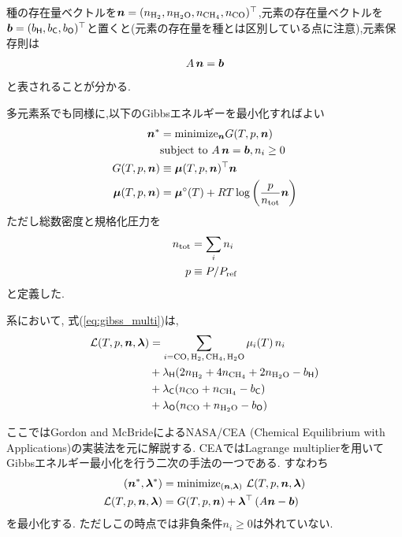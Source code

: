 種の存在量ベクトルを$\boldsymbol{n} = (n_\mathrm{H_2}, n_\mathrm{H_2 O},n_\mathrm{C H_4},n_\mathrm{CO})^\top$,元素の存在量ベクトルを$\boldsymbol{b} = (b_{\mathsf{H}}, b_{\mathsf{C}}, b_{\mathsf{O}})^\top$と置くと(元素の存在量を種とは区別している点に注意),元素保存則は
\begin{align}
    A \, \boldsymbol{n} = \boldsymbol{b} 
\end{align}
と表されることが分かる. 


多元素系でも同様に,以下のGibbsエネルギーを最小化すればよい
\begin{align}
\label{eq:gibss_multi}
    \boldsymbol{n}^\ast &= \mathrm{minimize}_{\boldsymbol{n}} G(T, p, \boldsymbol{n}) \nonumber \\
    &\mbox{subject to} \,\, A \, \boldsymbol{n} = \boldsymbol{b}, n_i \ge 0\\
    G(T, p, \boldsymbol{n}) &\equiv  \boldsymbol{\mu} (T, p, \boldsymbol{n})^\top \boldsymbol{n}\\ 
    \label{eq:chemical_potential_mu}
    \boldsymbol{\mu} (T, p, \boldsymbol{n}) &=  \boldsymbol{\mu}^\circ(T) + RT \log{\left(\frac{p}{n_\mathrm{tot}} \boldsymbol{n}\right)} 
\end{align}
ただし総数密度と規格化圧力を
\begin{align}
\label{eq:ntot_tce}
    n_\mathrm{tot} &= \sum_i n_i \\
    p &\equiv P/P_\mathrm{ref}
\end{align}
と定義した. 

系において, 式(\ref{eq:gibss_multi})は,
\begin{align}
    \mathcal{L}(T, p, \nv,\lambdav) &= \sum_{i = \ce{CO, H2, CH4, H2O}} \mu_i (T) \, n_i \nonumber \\ &+ \lambda_{\Hel} (2 n_{\ce{H2}} + 4 n_{\ce{CH4}} + 2 n_{\ce{H2O}} - b_\Hel) \nonumber \\
    &+ \lambda_{\Cel} (n_{\ce{CO}} + n_{\ce{CH4}} - b_\Cel) \nonumber \\ 
    &+  \lambda_{\Oel} ( n_{\ce{CO}} + n_{\ce{H2O}} - b_\Oel)
\end{align}

ここではGordon and McBrideによるNASA/CEA (Chemical Equilibrium with Applications)の実装法を元に解説する\cite{gordon1994computer,2024arXiv241207166G}. CEAではLagrange multiplierを用いてGibbsエネルギー最小化を行う二次の手法の一つである. すなわち
\begin{align}
    (\boldsymbol{n}^\ast, \boldsymbol{\lambda}^\ast)  &= \mathrm{minimize}_{(\boldsymbol{n},\boldsymbol{\lambda})} \,\, \mathcal{L}(T, p, \boldsymbol{n}, \boldsymbol{\lambda}) \\
    \mathcal{L}(T, p, \boldsymbol{n},\boldsymbol{\lambda}) &= G(T, p, \boldsymbol{n}) + \boldsymbol{\lambda}^\top \left(A \boldsymbol{n} - \boldsymbol{b}\right)  
\end{align}
を最小化する. ただしこの時点では非負条件$n_i \ge 0$は外れていない. 

